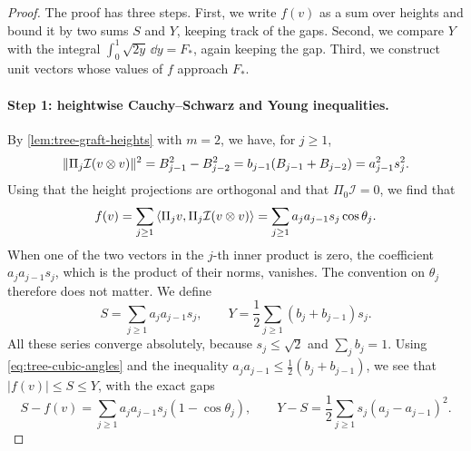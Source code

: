 \begin{proof}
The proof has three steps. First, we write $f(v)$ as a sum over heights and bound it by two sums $S$ and $Y$, keeping track of the gaps. Second, we compare $Y$ with the integral $\int_0^1\sqrt{2y}\,\dd y=F_*$, again keeping the gap. Third, we construct unit vectors whose values of $f$ approach $F_*$.

\paragraph{Step 1: heightwise Cauchy--Schwarz and Young inequalities.}
By \cref{lem:tree-graft-heights} with $m=2$, we have, for $j\ge1$,
\[
 \lVert\Pi_j\mathcal I(v\otimes v)\rVert^2=B_{j-1}^2-B_{j-2}^2=b_{j-1}(B_{j-1}+B_{j-2})=a_{j-1}^2s_j^2.
\]
Using that the height projections are orthogonal and that $\Pi_0\mathcal I=0$, we find that
\begin{equation}\label{eq:tree-cubic-angles}
 f(v)=\sum_{j\ge1}\left\langle\Pi_jv,\Pi_j\mathcal I(v\otimes v)\right\rangle=\sum_{j\ge1}a_ja_{j-1}s_j\cos\theta_j.
\end{equation}
When one of the two vectors in the $j$-th inner product is zero, the coefficient $a_ja_{j-1}s_j$, which is the product of their norms, vanishes. The convention on $\theta_j$ therefore does not matter. We define
\[
 S=\sum_{j\ge1}a_ja_{j-1}s_j,\qquad Y=\frac12\sum_{j\ge1}(b_j+b_{j-1})s_j.
\]
All these series converge absolutely, because $s_j\le\sqrt2$ and $\sum_jb_j=1$. Using \eqref{eq:tree-cubic-angles} and the inequality $a_ja_{j-1}\le\frac12(b_j+b_{j-1})$, we see that $|f(v)|\le S\le Y$, with the exact gaps
\begin{equation}\label{eq:tree-cubic-gaps}
 S-f(v)=\sum_{j\ge1}a_ja_{j-1}s_j(1-\cos\theta_j),\qquad
 Y-S=\frac12\sum_{j\ge1}s_j(a_j-a_{j-1})^2.
\end{equation}


\end{proof}
